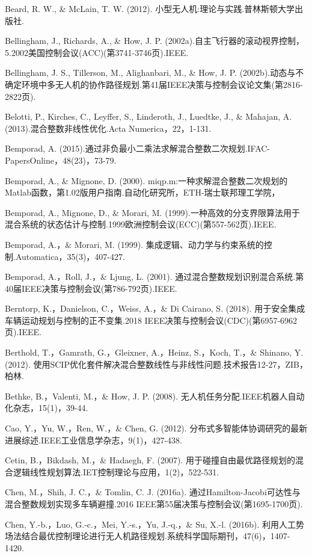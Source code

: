 \documentclass[10pt]{article}
\begin{document}
Beard, R. W., \& McLain, T. W. (2012). 小型无人机:理论与实践.普林斯顿大学出版社.

Bellingham, J., Richards, A., \& How, J. P. (2002a).自主飞行器的滚动视界控制，5.2002美国控制会议(ACC)(第3741-3746页).IEEE.

Bellingham, J. S., Tillerson, M., Alighanbari, M., \& How, J. P. (2002b).动态与不确定环境中多无人机的协作路径规划.第41届IEEE决策与控制会议论文集(第2816-2822页).

Belotti, P., Kirches, C., Leyffer, S., Linderoth, J., Luedtke, J., \& Mahajan, A. (2013).混合整数非线性优化.Acta Numerica，22，1-131.

Bemporad, A. (2015).通过非负最小二乘法求解混合整数二次规划.IFAC-PapersOnline，48(23)，73-79.

Bemporad, A., \& Mignone, D. (2000). miqp.m:一种求解混合整数二次规划的Matlab函数，第1.02版用户指南.自动化研究所，ETH-瑞士联邦理工学院，

Bemporad, A., Mignone, D., \& Morari, M. (1999).一种高效的分支界限算法用于混合系统的状态估计与控制.1999欧洲控制会议(ECC)(第557-562页).IEEE.

Bemporad, A.，\& Morari, M. (1999). 集成逻辑、动力学与约束系统的控制.Automatica，35(3)，407-427.

Bemporad, A.，Roll, J.，\& Ljung, L. (2001). 通过混合整数规划识别混合系统.第40届IEEE决策与控制会议(第786-792页).IEEE.

Berntorp, K.，Danielson, C.，Weiss, A.，\& Di Cairano, S. (2018). 用于安全集成车辆运动规划与控制的正不变集.2018 IEEE决策与控制会议(CDC)(第6957-6962页).IEEE.

Berthold, T.，Gamrath, G.，Gleixner, A.，Heinz, S.，Koch, T.，\& Shinano, Y. (2012). 使用SCIP优化套件解决混合整数线性与非线性问题.技术报告12-27，ZIB，柏林.

Bethke, B.，Valenti, M.，\& How, J. P. (2008). 无人机任务分配.IEEE机器人自动化杂志，15(1)，39-44.

Cao, Y.，Yu, W.，Ren, W.，\& Chen, G. (2012). 分布式多智能体协调研究的最新进展综述.IEEE工业信息学杂志，9(1)，427-438.

Cetin, B.，Bikdash, M.，\& Hadaegh, F. (2007). 用于碰撞自由最优路径规划的混合逻辑线性规划算法.IET控制理论与应用，1(2)，522-531.

Chen, M.，Shih, J. C.，\& Tomlin, C. J. (2016a). 通过Hamilton-Jacobi可达性与混合整数规划实现多车辆避撞.2016 IEEE第55届决策与控制会议(第1695-1700页).

Chen, Y.-b.，Luo, G.-c.，Mei, Y.-s.，Yu, J.-q.，\& Su, X.-l. (2016b). 利用人工势场法结合最优控制理论进行无人机路径规划.系统科学国际期刊，47(6)，1407-1420.
\end{document}
